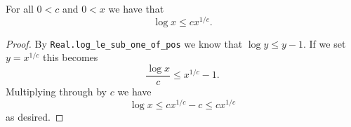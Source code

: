 \begin{lemma}
\label{Real.log_le_const_mul_rpow}
\leanok
For all $0<c$ and $0<x$ we have that
  $$\log x\leq cx^{1/c}.$$
\end{lemma}
\begin{proof}
\leanok
By \texttt{Real.log\_le\_sub\_one\_of\_pos} we know that $\log y\leq y-1$. If we set $y=x^{1/c}$ this becomes
  $$\frac{\log x}{c}\leq x^{1/c}-1.$$
  Multiplying through by $c$ we have
  $$\log x\leq cx^{1/c}-c\leq cx^{1/c}$$
  as desired.
\end{proof}
